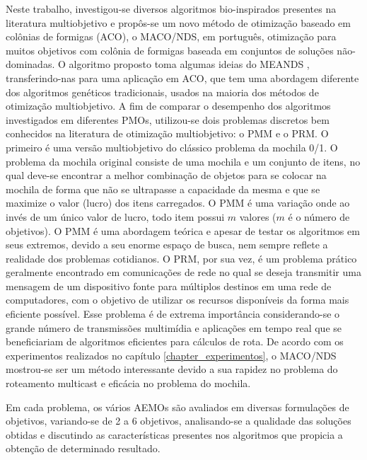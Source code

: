 Neste trabalho, investigou-se diversos algoritmos bio-inspirados presentes na literatura multiobjetivo e propôs-se um novo método de otimização baseado em colônias de formigas (ACO), o \ac{MACO/NDS}, em português, otimização para muitos objetivos com colônia de formigas baseada em conjuntos de soluções não-dominadas. O algoritmo proposto toma algumas ideias do MEANDS \cite{Lafeta2017}, transferindo-nas para uma aplicação em ACO, que tem uma abordagem diferente dos algoritmos genéticos tradicionais, usados na maioria dos métodos de otimização multiobjetivo. A fim de comparar o desempenho dos algoritmos investigados em diferentes \acp{PMO}, utilizou-se dois problemas discretos bem conhecidos na literatura de otimização multiobjetivo: o \ac{PMM} e o \ac{PRM}. O primeiro é uma versão multiobjetivo do clássico problema da mochila 0/1. O problema da mochila original consiste de uma mochila e um conjunto de itens, no qual deve-se encontrar a melhor combinação de objetos para se colocar na mochila de forma que não se ultrapasse a capacidade da mesma e que se maximize o valor (lucro) dos itens carregados. O PMM é uma variação onde ao invés de um único valor de lucro, todo item possui $m$ valores ($m$ é o número de objetivos). O \ac{PMM} é uma abordagem teórica e apesar de testar os algoritmos em seus extremos, devido a seu enorme espaço de busca, nem sempre reflete a realidade dos problemas cotidianos. O \ac{PRM}, por sua vez, é um problema prático geralmente encontrado em comunicações de rede no qual se deseja transmitir uma mensagem de um dispositivo fonte para múltiplos destinos em uma rede de computadores, com o objetivo de utilizar os recursos disponíveis da forma mais eficiente possível. Esse problema é de extrema importância considerando-se o grande número de transmissões multimídia e aplicações em tempo real que se beneficiariam de algoritmos eficientes para cálculos de rota. De acordo com os experimentos realizados no capítulo \ref{chapter_experimentos}, o MACO/NDS mostrou-se ser um método interessante devido a sua rapidez no problema do roteamento multicast e eficácia no problema do mochila.

Em cada problema, os vários AEMOs são avaliados em diversas formulações de objetivos, variando-se de 2 a 6 objetivos, analisando-se a qualidade das soluções obtidas e discutindo as características presentes nos algoritmos que propicia a obtenção de determinado resultado. 


